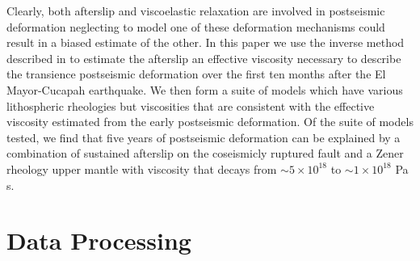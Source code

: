 \documentclass[12pt]{article}
\begin{document}
Clearly, both afterslip and viscoelastic relaxation are involved in postseismic deformation neglecting to model one of these deformation mechanisms could result in a biased estimate of the other.  In this paper we use the inverse method described in \citet{Hines2015} to estimate the afterslip an effective viscosity necessary to describe the transience postseismic deformation over the first ten months after the El Mayor-Cucapah earthquake. We then form a suite of models which have various lithospheric rheologies but viscosities that are consistent with the effective viscosity estimated from the early postseismic deformation. Of the suite of models tested, we find that five years of postseismic deformation can be explained by a combination of sustained afterslip on the coseismicly ruptured fault and a Zener rheology upper mantle with viscosity that decays from $\sim5\times10^{18}$ to $\sim1\times10^{18}$ Pa s. 


\section{Data Processing}\label{sec:Data}
\end{document}
